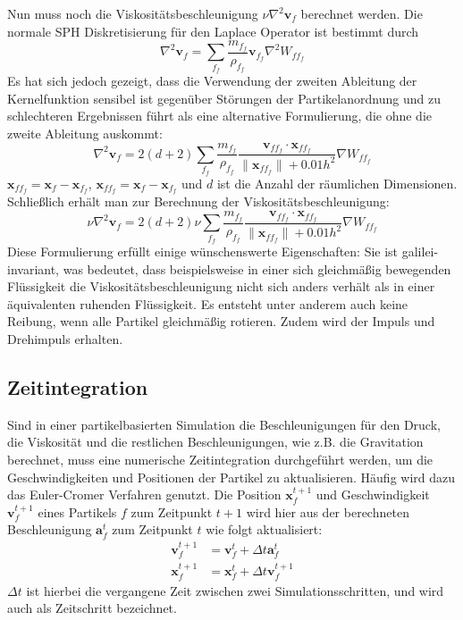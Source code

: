 \documentclass{scrreprt}
\begin{document}
Nun muss noch die Viskositätsbeschleunigung $\nu \nabla^2 \textbf{v}_f$ berechnet werden.
Die normale SPH Diskretisierung für den Laplace Operator ist bestimmt durch
\begin{equation}
    \nabla^2 \textbf{v}_f = \sum_{f_f} \frac{m_{f_f}}{\rho_{f_f}} \textbf{v}_{f_f} \nabla^2 W_{ff_f}
\end{equation}
Es hat sich jedoch gezeigt,
dass die Verwendung der zweiten Ableitung der Kernelfunktion sensibel ist gegenüber Störungen der Partikelanordnung
und zu schlechteren Ergebnissen führt als eine alternative Formulierung, die ohne die zweite Ableitung auskommt:
\begin{equation}
    \nabla^2 \textbf{v}_f = 2(d + 2) \sum_{f_f} \frac{m_{f_f}}{\rho_{f_f}} \frac{\textbf{v}_{ff_f} \cdot \textbf{x}_{ff_f}}{\|\textbf{x}_{ff_f}\| + 
    0.01h^2} \nabla W_{ff_f}
\end{equation}
$\textbf{x}_{ff_f} = \textbf{x}_f - \textbf{x}_{f_f}$, $\textbf{x}_{ff_f} = \textbf{x}_f - \textbf{x}_{f_f}$ und $d$ ist die Anzahl der räumlichen Dimensionen.
Schließlich erhält man zur Berechnung der Viskositätsbeschleunigung:
\begin{equation}
    \nu \nabla^2 \textbf{v}_f = 2(d + 2) \nu \sum_{f_f} \frac{m_{f_f}}{\rho_{f_f}} \frac{\textbf{v}_{ff_f} \cdot \textbf{x}_{ff_f}}{\|\textbf{x}_{ff_f}\| + 
    0.01h^2} \nabla W_{ff_f}
\end{equation}
Diese Formulierung erfüllt einige wünschenswerte Eigenschaften:
Sie ist galilei-invariant, was bedeutet, dass beispielsweise in einer sich gleichmäßig bewegenden Flüssigkeit
die Viskositätsbeschleunigung nicht sich anders verhält als in einer äquivalenten ruhenden Flüssigkeit.
Es entsteht unter anderem auch keine Reibung, wenn alle Partikel gleichmäßig rotieren.
Zudem wird der Impuls und Drehimpuls erhalten.


\subsection{Zeitintegration}
Sind in einer partikelbasierten Simulation die Beschleunigungen für den Druck, die Viskosität und die restlichen Beschleunigungen, wie z.B. die Gravitation berechnet,
muss eine numerische Zeitintegration durchgeführt werden, um die Geschwindigkeiten und Positionen der Partikel zu aktualisieren.
Häufig wird dazu das Euler-Cromer Verfahren genutzt. \cite{koschier_smoothed_2020}
Die Position $\textbf{x}_f^{t+1}$ und Geschwindigkeit $\textbf{v}_f^{t+1}$ eines Partikels $f$ zum Zeitpunkt $t+1$ 
wird hier aus der berechneten Beschleunigung $\textbf{a}_f^t$ zum Zeitpunkt $t$ wie folgt aktualisiert:
\begin{align}
    \textbf{v}_f^{t+1} &= \textbf{v}_f^t + \Delta t \textbf{a}_f^t\\
    \textbf{x}_f^{t+1} &= \textbf{x}_f^t + \Delta t \textbf{v}_f^{t+1}
\end{align}
$\Delta t$ ist hierbei die vergangene Zeit zwischen zwei Simulationsschritten, und wird auch als Zeitschritt bezeichnet.
\end{document}
